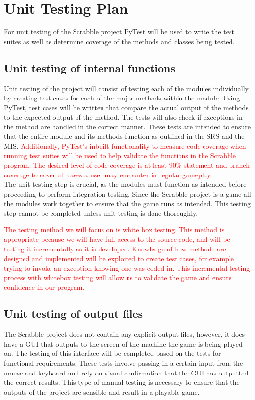 \documentclass[12pt, titlepage]{article}
\begin{document}
\section{Unit Testing Plan}%
For unit testing of the Scrabble project PyTest will be used to write the test suites as well as determine coverage of the methods and classes being tested. 
\subsection{Unit testing of internal functions}
Unit testing of the project will consist of testing each of the modules individually by creating test cases for each of the major methods within the module. Using PyTest, test cases will be written that  compare the actual output of the methods to the expected output of the method. The tests will also check if exceptions in the method are handled in the correct manner. These tests are intended to ensure that the entire module and its methods function as outlined in the SRS and the MIS. \textcolor{red}{Additionally, PyTest's inbuilt functionality to measure code coverage when running test suites will be used to help validate the functions in the Scrabble program. The desired level of code coverage is at least 90\% statement and branch coverage to cover all cases a user may encounter in regular gameplay.}\\
The unit testing step is crucial, as the modules must function as intended before proceeding to perform integration testing. Since the Scrabble project is a game all the modules work together to ensure that the game runs as intended. This testing step cannot be completed unless unit testing is done thoroughly.

\textcolor{red}{The testing method we will focus on is white box testing. This method is appropriate because we will have full access to the source code, and will be testing it incrementally as it is developed. Knowledge of how methods are designed and implemented will be exploited to create test cases, for example trying to invoke an exception knowing one was coded in. This incremental testing process with whitebox testing will allow us to validate the game and ensure confidence in our program.}
		
\subsection{Unit testing of output files}	
The Scrabble project does not contain any explicit output files, however, it does have a GUI that outputs to the screen of the machine the game is being played on. The testing of this interface will be completed based on the tests for functional requirements. These tests involve passing in a certain input from the mouse and keyboard and rely on visual confirmation that the GUI has outputted the correct results. This type of manual testing is necessary to ensure that the outputs of the project are sensible and result in a playable game.
\end{document}
